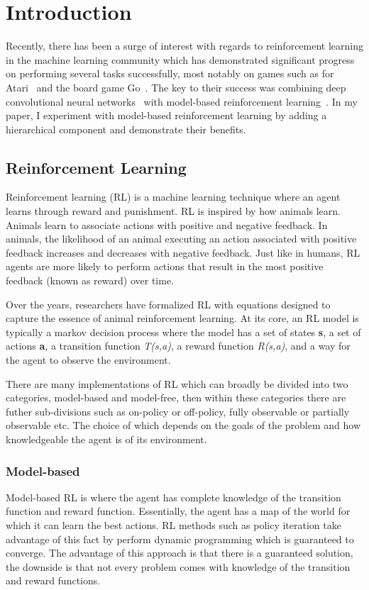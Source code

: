 \section{Introduction}
Recently, there has been a surge of interest with regards to reinforcement learning in the machine learning community which has demonstrated significant progress on performing several tasks successfully, most notably on games such as for Atari~\cite{mnih2015human} and the board game Go~\cite{silver2016mastering}. The key to their success was combining deep convolutional neural networks~\cite{krizhevsky2012imagenet} with model-based reinforcement learning~\cite{sutton1998reinforcement}. In my paper, I experiment with model-based reinforcement learning by adding a hierarchical component and demonstrate their benefits.

\subsection{Reinforcement Learning}
Reinforcement learning (RL) is a machine learning technique where an agent learns through reward and punishment. RL is inspired by how animals learn. Animals learn to associate actions with positive and negative feedback. In animals, the likelihood of an animal executing an action associated with positive feedback increases and decreases with negative feedback. Just like in humans, RL agents are more likely to perform actions that result in the most positive feedback (known as reward) over time. 

Over the years, researchers have formalized RL with equations designed to capture the essence of animal reinforcement learning. At its core, an RL model is typically a markov decision process where the model has a set of states \textbf{s}, a set of actions \textbf{a}, a transition function \textit{T(s,a)}, a reward function \textit{R(s,a)}, and a way for the agent to observe the environment.

There are many implementations of RL which can broadly be divided into two categories, model-based and model-free, then within these categories there are futher sub-divisions such as on-policy or off-policy, fully observable or partially observable etc. The choice of which depends on the goals of the problem and how knowledgeable the agent is of its environment.

\subsubsection{Model-based}
Model-based RL is where the agent has complete knowledge of the transition function and reward function. Essentially, the agent has a map of the world for which it can learn the best actions. RL methods such as policy iteration take advantage of this fact by perform dynamic programming which is guaranteed to converge. The advantage of this approach is that there is a guaranteed solution, the downside is that not every problem comes with knowledge of the transition and reward functions.

